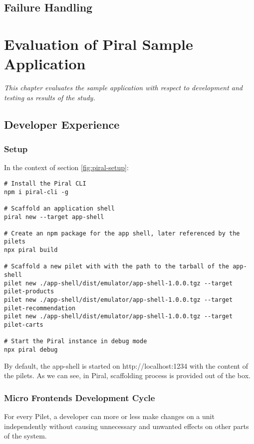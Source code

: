 \documentclass[a4paper]{book}
\begin{document}
\section{Failure Handling}

\chapter{Evaluation of Piral Sample Application} \label{Evaluation of Piral Sample Application}
\textit{This chapter evaluates the sample application with respect to development and testing as results of the study.}
\section{Developer Experience}
\subsection{Setup}
In the context of section \ref{fig:piral-setup}:
\begin{lstlisting}[caption={Complete setup with Piral}]
# Install the Piral CLI
npm i piral-cli -g

# Scaffold an application shell
piral new --target app-shell

# Create an npm package for the app shell, later referenced by the pilets
npx piral build

# Scaffold a new pilet with with the path to the tarball of the app-shell
pilet new ./app-shell/dist/emulator/app-shell-1.0.0.tgz --target pilet-products
pilet new ./app-shell/dist/emulator/app-shell-1.0.0.tgz --target pilet-recommendation
pilet new ./app-shell/dist/emulator/app-shell-1.0.0.tgz --target pilet-carts

# Start the Piral instance in debug mode
npx piral debug
\end{lstlisting}
By default, the app-shell is started on http://localhost:1234 with the content of the pilets. As we can see, in Piral, scaffolding process is provided out of the box.

\subsection{Micro Frontends Development Cycle}
For every Pilet, a developer can more or less make changes on a unit independently without causing unnecessary and unwanted effects on other parts of the system. 
\end{document}
